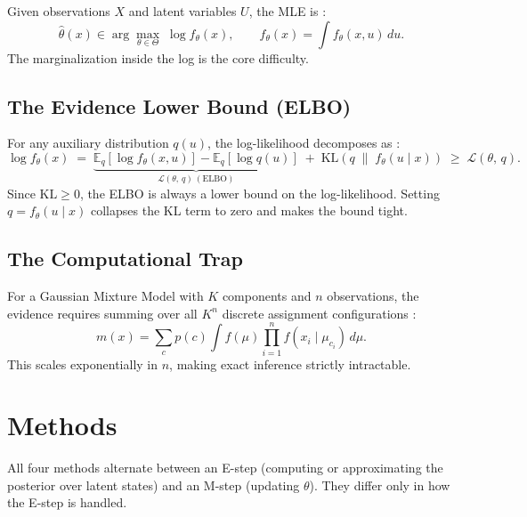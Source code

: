 \documentclass{article}
\newcommand{\E}{\mathbb{E}}
\newcommand{\KL}{\mathrm{KL}}
\begin{document}
Given observations $X$ and latent variables $U$, the MLE is
\citep{liu_ecen662_em}:
\begin{equation}
  \hat\theta(x) \in \arg\max_{\theta \in \Theta}\; \log f_\theta(x),
  \qquad f_\theta(x) = \int f_\theta(x, u)\, du.
\end{equation}
The marginalization inside the log is the core difficulty.

\subsection{The Evidence Lower Bound (ELBO)}

For any auxiliary distribution $q(u)$, the log-likelihood decomposes as
\citep{liu_ecen662_em}:
\begin{equation}
  \log f_\theta(x)
  \;=\;
  \underbrace{
    \E_q\!\left[\log f_\theta(x, u)\right] - \E_q\!\left[\log q(u)\right]
  }_{\displaystyle\mathcal{L}(\theta,\, q)\ (\text{ELBO})}
  \;+\;
  \KL\!\left(q \;\|\; f_\theta(u \mid x)\right)
  \;\geq\; \mathcal{L}(\theta,\, q).
  \label{eq:elbo}
\end{equation}
Since $\KL \geq 0$, the ELBO is always a lower bound on the log-likelihood.
Setting $q = f_\theta(u \mid x)$ collapses the KL term to zero and makes the
bound tight.

\subsection{The Computational Trap}

For a Gaussian Mixture Model with $K$ components and $n$ observations, the
evidence requires summing over all $K^n$ discrete assignment configurations
\citep{liu_ecen662_vi}:
\begin{equation}
  m(x) = \sum_c p(c) \int f(\mu) \prod_{i=1}^n f(x_i \mid \mu_{c_i})\, d\mu.
\end{equation}
This scales exponentially in $n$, making exact inference strictly intractable.

\section{Methods}

All four methods alternate between an E-step (computing or approximating
the posterior over latent states) and an M-step (updating $\theta$). They
differ only in how the E-step is handled.
\end{document}
